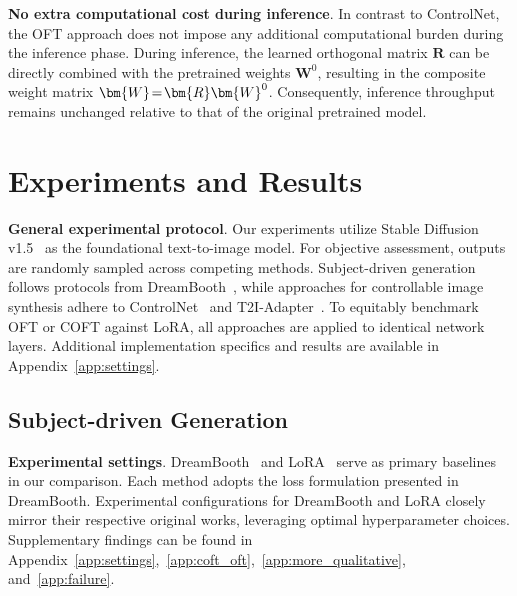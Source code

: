 \textbf{No extra computational cost during inference}. In contrast to ControlNet, the OFT approach does not impose any additional computational burden during the inference phase. During inference, the learned orthogonal matrix $\bm{R}$ can be directly combined with the pretrained weights $\bm{W}^0$, resulting in the composite weight matrix $\thickmuskip=2mu \medmuskip=2mu \bm{W} = \bm{R} \bm{W}^0$. Consequently, inference throughput remains unchanged relative to that of the original pretrained model.

\section{Experiments and Results}

\textbf{General experimental protocol}. Our experiments utilize Stable Diffusion v1.5~\cite{rombach2022high} as the foundational text-to-image model. For objective assessment, outputs are randomly sampled across competing methods. Subject-driven generation follows protocols from DreamBooth~\cite{ruiz2023dreambooth}, while approaches for controllable image synthesis adhere to ControlNet~\cite{zhang2023adding} and T2I-Adapter~\cite{mou2023t2i}. To equitably benchmark OFT or COFT against LoRA, all approaches are applied to identical network layers. Additional implementation specifics and results are available in Appendix~\ref{app:settings}.

\subsection{Subject-driven Generation}

\textbf{Experimental settings}. DreamBooth~\cite{ruiz2023dreambooth} and LoRA~\cite{hulora2022} serve as primary baselines in our comparison. Each method adopts the loss formulation presented in DreamBooth. Experimental configurations for DreamBooth and LoRA closely mirror their respective original works, leveraging optimal hyperparameter choices. Supplementary findings can be found in Appendix~\ref{app:settings},~\ref{app:coft_oft},~\ref{app:more_qualitative}, and~\ref{app:failure}.

